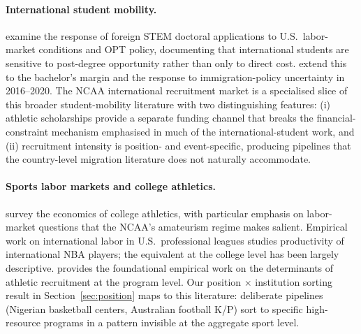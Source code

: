 \documentclass[11pt]{article}
\begin{document}
\paragraph{International student mobility.}
\citet{bound2015passage} examine the response of foreign STEM
doctoral applications to U.S.\ labor-market conditions and OPT
policy, documenting that international students are sensitive to
post-degree opportunity rather than only to direct cost.
\citet{bound2021international} extend this to the bachelor's
margin and the response to immigration-policy uncertainty in
2016--2020. The NCAA international recruitment market is a
specialised slice of this broader student-mobility literature
with two distinguishing features: (i) athletic scholarships
provide a separate funding channel that breaks the
financial-constraint mechanism emphasised in much of the
international-student work, and (ii) recruitment intensity is
position- and event-specific, producing pipelines that the
country-level migration literature does not naturally
accommodate.

\paragraph{Sports labor markets and college athletics.}
\citet{sanderson2018sport} survey the economics of college
athletics, with particular emphasis on labor-market questions
that the NCAA's amateurism regime makes salient. Empirical work
on international labor in U.S.\ professional leagues
\citep{berri2007one} studies productivity of international NBA
players; the equivalent at the college level has been largely
descriptive. \citet{brown1993revenues} provides the foundational
empirical work on the determinants of athletic recruitment at the
program level. Our position $\times$ institution sorting result
in Section~\ref{sec:position} maps to this literature: deliberate
pipelines (Nigerian basketball centers, Australian football K/P)
sort to specific high-resource programs in a pattern invisible at
the aggregate sport level.
\end{document}
